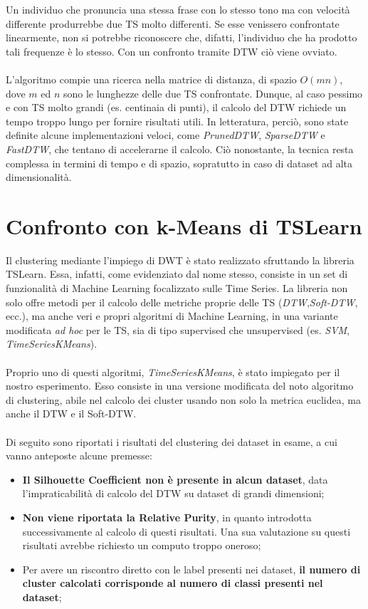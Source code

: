 Un individuo che pronuncia una stessa frase con lo stesso tono ma con velocità differente produrrebbe due TS molto differenti. Se esse venissero confrontate linearmente, non si potrebbe riconoscere che, difatti, l'individuo che ha prodotto tali frequenze è lo stesso. Con un confronto tramite DTW ciò viene ovviato.\\
\\
L'algoritmo compie una ricerca nella matrice di distanza, di spazio $O(mn)$, dove $m$ ed $n$ sono le lunghezze delle due TS confrontate.
Dunque, al caso pessimo e con TS molto grandi (es. centinaia di punti), il calcolo del DTW richiede un tempo troppo lungo per fornire risultati utili. In letteratura, perciò, sono state definite alcune implementazioni veloci, come \textit{PrunedDTW}, \textit{SparseDTW} e \textit{FastDTW}, che tentano di accelerarne il calcolo. Ciò nonostante, la tecnica resta complessa in termini di tempo e di spazio, sopratutto in caso di dataset ad alta dimensionalità.\\

\section{Confronto con k-Means di TSLearn}\label{sec:tslearn}
Il clustering mediante l'impiego di DWT è stato realizzato sfruttando la libreria TSLearn.
Essa, infatti, come evidenziato dal nome stesso, consiste in un set di funzionalità di  Machine Learning focalizzato sulle Time Series.
La libreria non solo offre metodi per il calcolo delle metriche proprie delle TS (\textit{DTW},\textit{Soft-DTW}, ecc.), ma anche veri e propri algoritmi di Machine Learning, in una variante modificata \textit{ad hoc} per le TS, sia di tipo supervised che unsupervised (es. \textit{SVM}, \textit{TimeSeriesKMeans}).\\
\\
Proprio uno di questi algoritmi, \textit{TimeSeriesKMeans}, è stato impiegato per il nostro esperimento.
Esso consiste in una versione modificata del noto algoritmo di clustering, abile nel calcolo dei cluster usando non solo la metrica euclidea, ma anche il DTW e il Soft-DTW.\\
\\
Di seguito sono riportati i risultati del clustering dei dataset in esame, a cui vanno anteposte alcune premesse:
\begin{itemize}
	\item \textbf{Il Silhouette Coefficient non è presente in alcun dataset}, data l'impraticabilità di calcolo del DTW su dataset di grandi dimensioni;
	\item \textbf{Non viene riportata la Relative Purity}, in quanto introdotta successivamente al calcolo di questi risultati. Una sua valutazione su questi risultati avrebbe richiesto un computo troppo oneroso;
	\item Per avere un riscontro diretto con le label presenti nei dataset, \textbf{il numero di cluster calcolati corrisponde al numero di classi presenti nel dataset};
\end{itemize}

